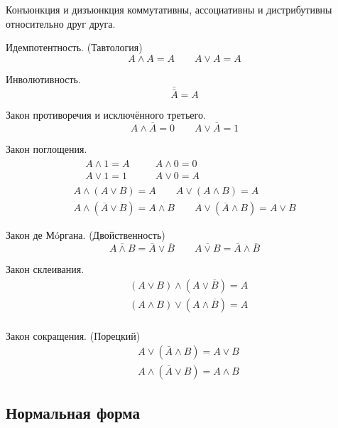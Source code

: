 Конъюнкция и дизъюнкция {\ital коммутативны}, {\ital ассоциативны} и {\ital дистрибутивны} относительно друг друга.
\begin{theorem}
{\bold Идемпотентность.} {\ital\color{desc} (Тавтология)}
$$A\land A=A\qquad A\lor A=A$$
\end{theorem}
\begin{theorem}
{\bold Инволютивность.}
$$\bar{\bar{A}}=A$$
\end{theorem}
\begin{theorem}
{\bold Закон противоречия} и {\bold исключённого третьего.}
$$A\land\overline{A}=0\qquad A\lor\overline{A}=1$$
\end{theorem}
\begin{theorem}
{\bold Закон поглощения.}
$$\begin{gathered}\begin{aligned}
&A\land 1=A &\quad &A\land 0=0\\
&A\lor 1=1 &\quad &A\lor 0=A
\end{aligned}\\
A\land (A\lor B)=A\qquad A\lor (A\land B)=A\\
A\land (\overline{A}\lor B)=A\land B\qquad A\lor (\overline{A}\land B)=A\lor B\end{gathered}$$
\end{theorem}
\begin{theorem}
{\bold Закон де Мóргана.} {\ital\color{desc} (Двойственность)}
$$\overline{A\land B}=\overline{A}\lor\overline{B}\qquad\overline{A\lor B}=\overline{A}\land\overline{B}$$
\end{theorem}
\begin{theorem}
{\bold Закон склеивания.}
$$\begin{aligned}
&(A\lor B)\land(A\lor \overline{B})=A\\
&(A\land B)\lor(A\land \overline{B})=A\\
\end{aligned}$$
\end{theorem}
\begin{theorem}
{\bold Закон сокращения.} {\ital\color{desc} (Порецкий)}
$$\begin{aligned}
&A\lor(\bar{A}\land B)=A\lor B\\
&A\land(\bar{A}\lor B)=A\land B
\end{aligned}$$
\end{theorem}

\subsection{Нормальная форма}

